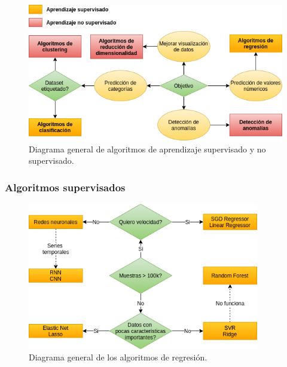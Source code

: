 \documentclass[a4paper,12pt]{article}
\begin{document}
\begin{figure}[H]
	\begin{center}				
		\includegraphics[width=1\textwidth]{maindiagram.png}
		\caption{Diagrama general de algoritmos de aprendizaje supervisado y no supervisado.}
		\label{fig:maindiagram.}
	\end{center}
\end{figure}

\subsubsection{Algoritmos supervisados}

\begin{figure}[H]
	\begin{center}				
		\includegraphics[width=0.9\textwidth]{regressiondiagram.png}
		\caption{Diagrama general de los algoritmos de regresión.}
		\label{fig:regressiondiagram.}
	\end{center}
\end{figure}
\end{document}
